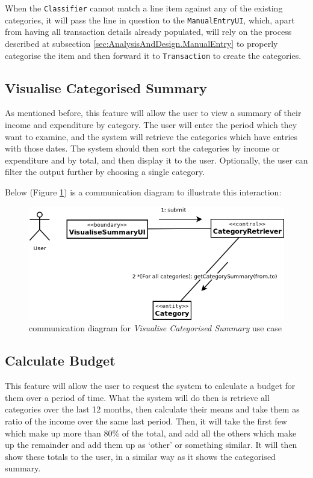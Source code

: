 When the \texttt{Classifier} cannot match a line item against any of the existing
categories, it will pass the line in question to the \texttt{ManualEntryUI},
which, apart from having all transaction details already populated, will rely
on the process described at subsection \ref{sec:AnalysisAndDesign.ManualEntry}
to properly categorise the item and then forward it to \texttt{Transaction} to
create the categories.

\subsection{Visualise Categorised Summary} \label{sec:AnalysisAndDesign.ViewSummary}
As mentioned before, this feature will allow the user to view a summary of
their income and expenditure by category.  The user will enter the period which
they want to examine, and the system will retrieve the categories which have
entries with those dates.  The system should then sort the categories by income
or expenditure and by total, and then display it to the user. Optionally, the
user can filter the output further by choosing a single category.

Below (Figure \ref{fig:CommDiagram.VisualiseCategorisedSummary}) is a
communication diagram to illustrate this interaction: \begin{figure}[ht!]
  \begin{center}
    \includegraphics[width=16cm]{./contents/img/Comm_Diagram_-_Visualise_Categorised_Summary.png}
  \end{center}
  \caption{communication diagram for \emph{Visualise Categorised Summary} use case}
  \label{fig:CommDiagram.VisualiseCategorisedSummary}
\end{figure}



\subsection{Calculate Budget} \label{sec:AnalysisAndDesign.CalculateBudget}
This feature will allow the user to request the system to calculate a budget
for them over a period of time. What the system will do then is retrieve all
categories over the last 12 months, then calculate their means and take them as
ratio of the income over the same last period. Then, it will take the first few
which make up more than 80\% of the total, and add all the others which make up
the remainder and add them up as `other' or something similar. It will then
show these totals to the user, in a similar way as it shows the categorised
summary.

